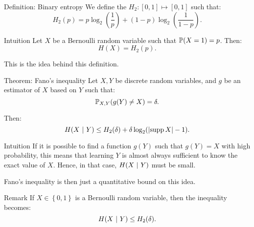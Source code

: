 \documentclass[a4paper]{article}
\begin{document}
\begin{parag}{Definition: Binary entropy}
    We define the  $H_2: \left[0, 1\right] \mapsto \left[0, 1\right]$ such that: 
    \[H_2\left(p\right) = p \log_2\left(\frac{1}{p}\right) + \left(1-p\right) \log_2\left(\frac{1}{1-p}\right).\]
    
    \begin{subparag}{Intuition}
        Let $X$ be a Bernoulli random variable such that $\prob\left(X = 1\right) = p$. Then: 
        \[H\left(X\right) = H_2\left(p\right).\]

        This is the idea behind this definition.
    \end{subparag}
\end{parag}

\begin{parag}{Theorem: Fano's inequality}
    Let $X, Y$ be discrete random variables, and $g$ be an estimator of $X$ based on $Y$ such that: 
    \[\prob_{X, Y}\left(g\left(Y\right) \neq X\right) = \delta.\]
    
    Then: 
    \[H\left(X \suchthat Y\right) \leq H_2\left(\delta\right) + \delta \log_2\left(\left|\supp X\right| - 1\right).\]

    \begin{subparag}{Intuition}
        If it is possible to find a function $g\left(Y\right)$ such that $g\left(Y\right) = X$ with high probability, this means that learning $Y$ is almost always sufficient to know the exact value of $X$. Hence, in that case, $H\left(X \suchthat Y\right)$ must be small.

        Fano's inequality is then just a quantitative bound on this idea.
    \end{subparag}

    \begin{subparag}{Remark}
        If $X \in \left\{0, 1\right\}$ is a Bernoulli random variable, then the inequality becomes: 
        \[H\left(X \suchthat Y\right) \leq H_2\left(\delta\right).\]
    \end{subparag}
\end{parag}
\end{document}
